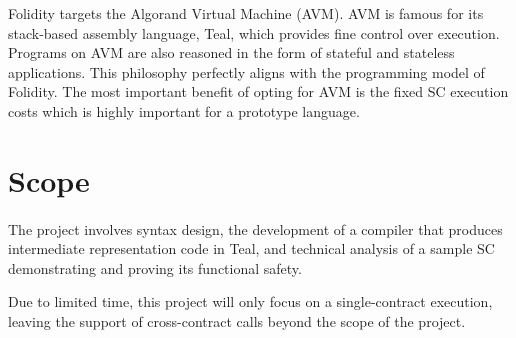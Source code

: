 \documentclass[10pt, a4paper]{article}
\begin{document}
Folidity targets the Algorand Virtual Machine (AVM). AVM is famous for its stack-based assembly language, Teal, which provides fine control over execution. Programs on AVM are also reasoned in the form of stateful and stateless applications. This philosophy perfectly aligns with the programming model of Folidity. The most important benefit of opting for AVM is the fixed SC execution costs which is highly important for a prototype language.

\section*{Scope}
\paragraph{}
The project involves syntax design, the development of a compiler that produces intermediate representation code in Teal, and technical analysis of a sample SC demonstrating and proving its functional safety.

Due to limited time, this project will only focus on a single-contract execution, leaving the support of cross-contract calls beyond the scope of the project.
\end{document}
